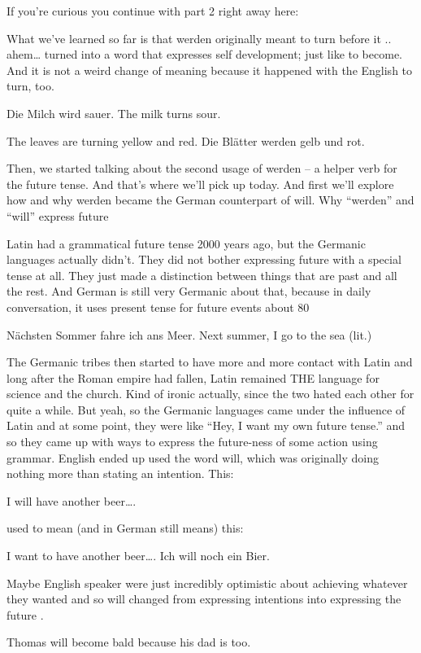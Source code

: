 \documentclass[a4paper,12pt]{article}
\begin{document}
\begin{adjustwidth}{2em}{0pt}
\begin{adjustwidth}{3em}{0pt}
If you’re curious you continue with part 2 right away here:


What we’ve learned so far is that werden originally meant to turn before it .. ahem… turned into a word that expresses self development; just like to become. And it is not a weird change of meaning because it happened with the English to turn, too.

    Die Milch wird sauer.
    The milk turns sour.

    The leaves are turning yellow and red.
    Die Blätter werden gelb und rot.

Then, we started talking about the second usage of werden – a helper verb for the future tense.
And that’s where we’ll pick up today. And first we’ll explore how and why werden became the German counterpart of will. 
Why “werden” and “will” express future


Latin had a grammatical future tense 2000 years ago, but the Germanic languages actually didn’t. They did not bother expressing future with a special tense at all. They just made a distinction between things that are past and all the rest. And German is still very Germanic about that, because in daily conversation, it uses present tense for future events about 80%

    Nächsten Sommer fahre ich ans Meer.
    Next summer, I go to the sea (lit.)

The Germanic tribes then started to have more and more contact with Latin and long after the Roman empire had fallen, Latin remained THE language for science and the church. Kind of ironic actually, since the two hated each other for quite a while.
But yeah, so the Germanic languages came under the influence of Latin and at some point, they were like “Hey, I want my own future tense.” and so they came up with ways to express the future-ness of some action using grammar.
English ended up used the word will, which was originally doing nothing more than stating an intention. This:

    I will have another beer….

used to mean (and in German still means) this:

    I want to have another beer….
    Ich will noch ein Bier.

Maybe English speaker were just incredibly optimistic about achieving whatever they wanted and so will changed from expressing intentions into expressing the future . 

    Thomas will become bald because his dad is too.


\end{adjustwidth}
\end{adjustwidth}
\end{document}
